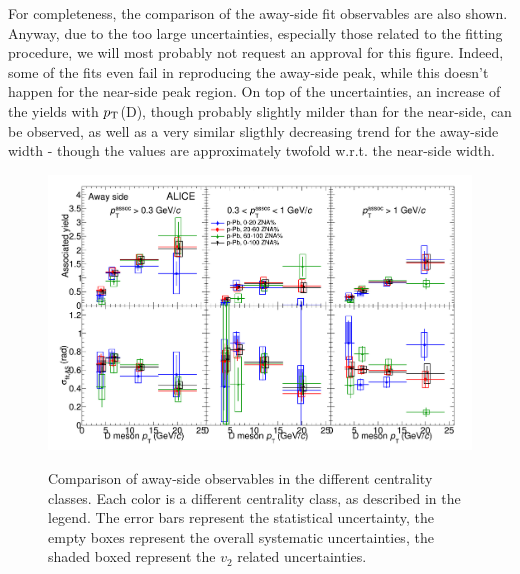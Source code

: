 For completeness, the comparison of the away-side fit observables are also shown. Anyway, due to the too large uncertainties, especially those related to the fitting procedure, we will most probably not request an approval for this figure. Indeed, some of the fits even fail in reproducing the away-side peak, while this doesn't happen for the near-side peak region. On top of the uncertainties, an increase of the yields with $p_{\rm T}$(D), though probably slightly milder than for the near-side, can be observed, as well as a very similar sligthly decreasing trend for the away-side width - though the values are approximately twofold w.r.t. the near-side width.

\begin{landscape}
\begin{figure}
\centering
{\includegraphics[width=0.95\linewidth]{figuresVsCent/Averages/Trends/ComparePPbVsCentFitResults_AwaySide.png}}
 \caption{Comparison of away-side observables in the different centrality classes. Each color is a different centrality class, as described in the legend. The error bars represent the statistical uncertainty, the empty boxes represent the overall systematic uncertainties, the shaded boxed represent the $v_2$ related uncertainties.}
\label{fig:prel3}
\end{figure}
 \end{landscape} 